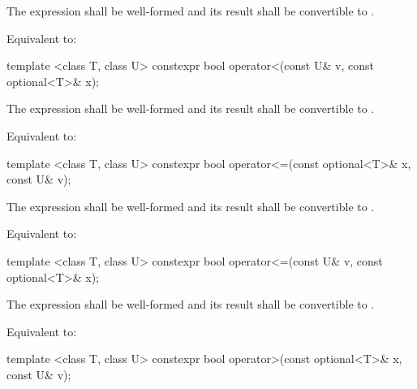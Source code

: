 \begin{itemdescr}
\pnum
\requires
The expression  shall be well-formed and
its result shall be convertible to .

\pnum
\effects
Equivalent to: 
\end{itemdescr}

%
\begin{itemdecl}
template <class T, class U> constexpr bool operator<(const U& v, const optional<T>& x);
\end{itemdecl}

\begin{itemdescr}
\pnum
\requires
The expression  shall be well-formed and
its result shall be convertible to .

\pnum
\effects
Equivalent to: 
\end{itemdescr}

%
\begin{itemdecl}
template <class T, class U> constexpr bool operator<=(const optional<T>& x, const U& v);
\end{itemdecl}

\begin{itemdescr}
\pnum
\requires
The expression  shall be well-formed and
its result shall be convertible to .

\pnum
\effects
Equivalent to: 
\end{itemdescr}

%
\begin{itemdecl}
template <class T, class U> constexpr bool operator<=(const U& v, const optional<T>& x);
\end{itemdecl}

\begin{itemdescr}
\pnum
\requires
The expression  shall be well-formed and
its result shall be convertible to .

\pnum
\effects
Equivalent to: 
\end{itemdescr}

%
\begin{itemdecl}
template <class T, class U> constexpr bool operator>(const optional<T>& x, const U& v);
\end{itemdecl}

